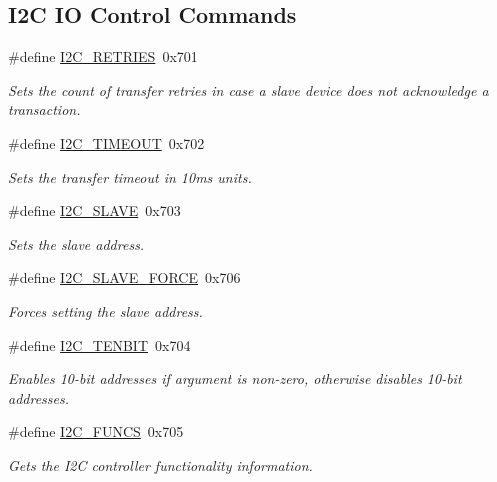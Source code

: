 \subsection*{I2C IO Control Commands}
\begin{DoxyCompactItemize}
\item 
\#define \mbox{\hyperlink{group__I2CLinux_gae8b7ab32459314e0c0162974f2ce22e1}{I2\+C\+\_\+\+R\+E\+T\+R\+I\+ES}}~0x701
\begin{DoxyCompactList}\small\item\em Sets the count of transfer retries in case a slave device does not acknowledge a transaction. \end{DoxyCompactList}\item 
\#define \mbox{\hyperlink{group__I2CLinux_gafa3215f0aa766367f5d34bee80929152}{I2\+C\+\_\+\+T\+I\+M\+E\+O\+UT}}~0x702
\begin{DoxyCompactList}\small\item\em Sets the transfer timeout in 10ms units. \end{DoxyCompactList}\item 
\#define \mbox{\hyperlink{group__I2CLinux_gab15137f7c592d05573de99f078516157}{I2\+C\+\_\+\+S\+L\+A\+VE}}~0x703
\begin{DoxyCompactList}\small\item\em Sets the slave address. \end{DoxyCompactList}\item 
\#define \mbox{\hyperlink{group__I2CLinux_gafb1764d4b58fb542306c715ad6a28a42}{I2\+C\+\_\+\+S\+L\+A\+V\+E\+\_\+\+F\+O\+R\+CE}}~0x706
\begin{DoxyCompactList}\small\item\em Forces setting the slave address. \end{DoxyCompactList}\item 
\#define \mbox{\hyperlink{group__I2CLinux_ga2a0b1f3843e98977be7476579c851305}{I2\+C\+\_\+\+T\+E\+N\+B\+IT}}~0x704
\begin{DoxyCompactList}\small\item\em Enables 10-\/bit addresses if argument is non-\/zero, otherwise disables 10-\/bit addresses. \end{DoxyCompactList}\item 
\#define \mbox{\hyperlink{group__I2CLinux_ga4c2f02700f22d4f76c670966aed5079a}{I2\+C\+\_\+\+F\+U\+N\+CS}}~0x705
\begin{DoxyCompactList}\small\item\em Gets the I2C controller functionality information. \end{DoxyCompactList}\item 

\end{DoxyCompactItemize}
